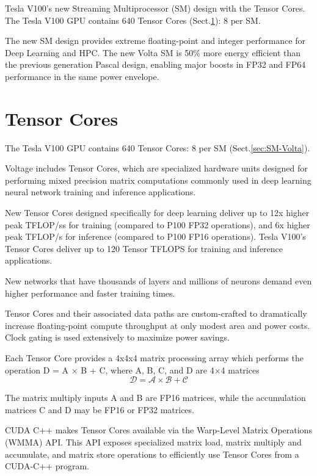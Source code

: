 Tesla V100’s new Streaming Multiprocessor (SM) design with the Tensor Cores. The
Tesla V100 GPU contains 640 Tensor Cores (Sect.\ref{sec:Tensor-Core}): 8 per SM.


The new SM design provides extreme floating-point and integer performance for
Deep Learning and HPC. The new Volta SM is 50\% more energy efficient than the
previous generation Pascal design, enabling major boosts in FP32 and FP64
performance in the same power envelope.


\section{Tensor Cores}
\label{sec:Tensor-Core}

The Tesla V100 GPU contains 640 Tensor Cores: 8 per SM (Sect.\ref{sec:SM-Volta}).

Voltage includes Tensor Cores, which are specialized hardware units designed for
performing mixed precision matrix computations commonly used in deep learning
neural network training and inference applications.


New Tensor Cores designed specifically for deep learning deliver up to 12x
higher peak TFLOP/ss for training (compared to P100 FP32 operations), and 6x
higher peak TFLOP/s for inference (compared to P100 FP16 operations).
Tesla V100’s Tensor Cores deliver up to 120 Tensor TFLOPS for training and
inference applications.

New networks that have thousands of layers and millions of neurons demand even
higher performance and faster training times.


Tensor Cores and their associated data paths are custom-crafted to dramatically
increase floating-point compute throughput at only modest area and power costs.
Clock gating is used extensively to maximize power savings.


Each Tensor Core provides a 4x4x4 matrix processing array which performs the
operation D = A × B + C, where A, B, C, and D are 4×4 matrices
\begin{equation}
\mathcal{D = A \times B + C}
\end{equation}

The matrix multiply inputs A and B are FP16 matrices, while the accumulation
matrices C and D may be FP16 or FP32 matrices.

CUDA C++ makes Tensor Cores available via the Warp-Level Matrix Operations
(WMMA) API. This API exposes specialized matrix load, matrix multiply and
accumulate, and matrix store operations to efficiently use Tensor Cores from a
CUDA-C++ program.

